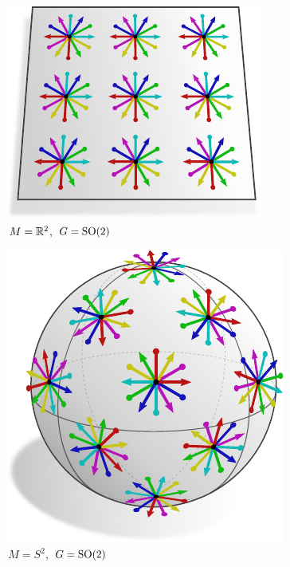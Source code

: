 \\[2ex]
%
%
%
%
\begin{subfigure}[b]{0.26\textwidth}
	\centering
	\includegraphics[width=1.\textwidth]{figures/G_structure_R2_2_big.pdf}
	\captionsetup{format=hang}
	\caption{\small
		\,$M = \mathbb{R}^2$,
		\,$G = \operatorname{SO}(2)$
	}
	\label{fig:G_structure_intro_g}
\end{subfigure}
\hfill
\begin{subfigure}[b]{0.26\textwidth}
	\centering
	\includegraphics[width=.95\textwidth]{figures/G_structure_S2_1.pdf}
	\vspace*{-2ex}
	\captionsetup{format=hang}
	\caption{\small
		\,$M = S^2$,
		\,$G = \operatorname{SO}(2)$
	}
	\label{fig:G_structure_intro_h}
\end{subfigure}
